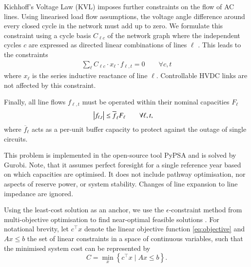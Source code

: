 Kichhoff's Voltage Law (KVL) imposes further constraints on the flow of AC lines.
Using linearised load flow assumptions, the voltage angle difference around every closed cycle in the
network must add up to zero. We formulate this constraint using a cycle basis $C_{\ell c}$
of the network graph where the independent cycles $c$ are expressed as
directed linear combinations of lines $\ell$ \cite{cycleflows}.
This leads to the constraints
\begin{align}
    \sum_\ell C_{\ell c} \cdot x_\ell \cdot f_{\ell,t} = 0 \qquad\forall c,t
    \label{eq:kvl}
\end{align}
where $x_\ell$ is the series inductive reactance of line $\ell$.
Controllable HVDC links are not affected by this constraint.

Finally, all line flows $f_{\ell,t}$ must be operated within their nominal capacities $F_\ell$
\begin{align}
    \left|f_{\ell,t}\right| \leq \overline{f}_{\ell} F_{\ell} & \qquad\forall \ell, t,
    \label{eq:lastA}
\end{align}
where $\overline{f}_\ell$ acts as a per-unit buffer capacity
to protect against the outage of single circuits.

This problem is implemented in the open-source tool PyPSA \cite{pypsa} and is solved by Gurobi.
Note, that it assumes perfect foresight for a single reference year based on which capacities are optimised.
It does not include pathway optimisation, nor aspects of reserve power, or system stability.
Changes of line expansion to line impedance are ignored.


Using the least-cost solution as an anchor, we use the
$\epsilon$-constraint method from multi-objective optimisation
to find near-optimal feasible solutions \cite{nearoptimal,mavrotas_effective_2009}.
For notational brevity, let $c^\top x$ denote the linear objective function \cref{eq:objective}
and $Ax\leq b$ the set of linear constraints 
in a space of continuous variables,
such that the minimised system cost can be represented by
\begin{equation}
    C = \min_x\left\{c^\top x \mid Ax\leq b\right\}.
\end{equation}


